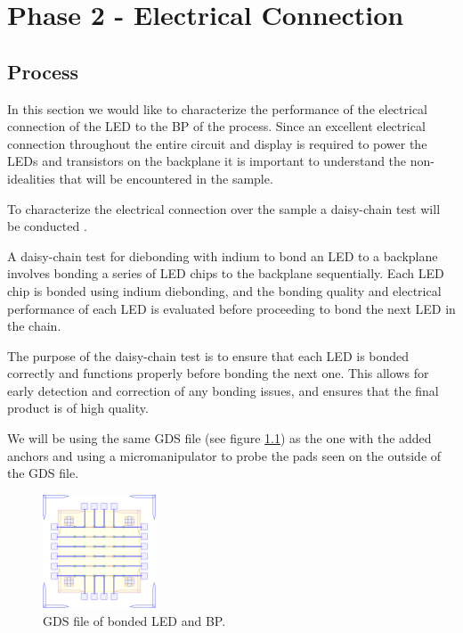 \chapter{Phase 2 - Electrical Connection}
\label{sec:Ch3_elec}

\section{Process}
In this section we would like to characterize the performance of the electrical connection of the LED to the BP of the process. Since an excellent electrical connection throughout the entire circuit and display is required to power the LEDs and transistors on the backplane it is important to understand the non-idealities that will be encountered in the sample.

To characterize the electrical connection over the sample a daisy-chain test will be conducted \cite{daisychainTest}.

A daisy-chain test for diebonding with indium to bond an LED to a backplane involves bonding a series of LED chips to the backplane sequentially. Each LED chip is bonded using indium diebonding, and the bonding quality and electrical performance of each LED is evaluated before proceeding to bond the next LED in the chain.

The purpose of the daisy-chain test is to ensure that each LED is bonded correctly and functions properly before bonding the next one. This allows for early detection and correction of any bonding issues, and ensures that the final product is of high quality.

We will be using the same GDS file (see figure \ref{fig:ch3_gds_bp_led_anchors}) as the one with the added anchors and using a micromanipulator to probe the pads seen on the outside of the GDS file.


\begin{figure}
    \centering
    \includegraphics[width=0.3\textwidth]{Main/Ch2/DC_DieBTest_V5.GDStex_output.pdf}
    \caption{GDS file of bonded LED and BP. }
    \label{fig:ch3_gds_bp_led_anchors}
\end{figure}


